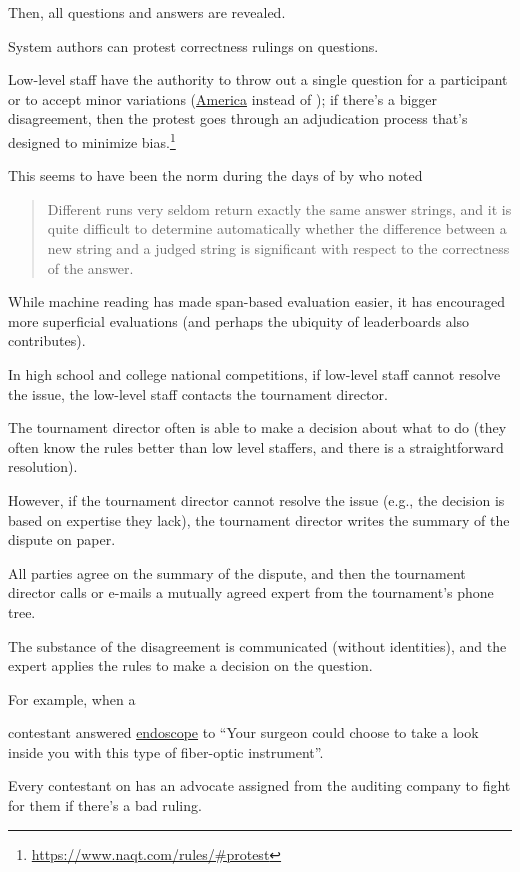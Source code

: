Then, all questions and answers are revealed.

System authors can protest correctness rulings on questions.

Low-level staff have the authority to throw out a single question for
a participant or to accept minor variations (\underline{America} instead
of \underline{}); if there's a bigger disagreement, then the protest goes
through an adjudication process that's designed to minimize
bias.\footnote{\url{https://www.naqt.com/rules/\#protest}}  

This seems to have been the norm during the days of  by  who noted
\begin{quote}
    Different  runs very seldom return exactly the same answer strings, and it is quite difficult to determine automatically whether the difference between a new string and a judged string is significant with respect to the correctness of the answer.
\end{quote} 

While machine reading has made span-based evaluation easier, it has encouraged more superficial evaluations (and perhaps the ubiquity of leaderboards also contributes).

In high school and college national competitions, if low-level staff cannot resolve the issue, the low-level staff contacts the tournament director.

The tournament director often is able to make a decision about what to do (they often know the rules better than low level staffers, and there is a straightforward resolution).

However, if the tournament director cannot resolve the issue (e.g., the decision is based on expertise they lack), the tournament director writes the summary of the dispute on paper.

All parties agree on the summary of the dispute, and then the tournament director calls or e-mails a mutually agreed expert from the tournament's phone tree.

The substance of the disagreement is communicated (without identities), and the expert applies the rules to make a decision on the question.

For example, when a 

\jeopardy{} contestant answered \underline{endoscope} to ``Your surgeon could choose to take a look inside you with this type of fiber-optic instrument''.

Every contestant on \jeopardy{} has an advocate assigned from the
auditing company to fight for them if there's a bad ruling.

